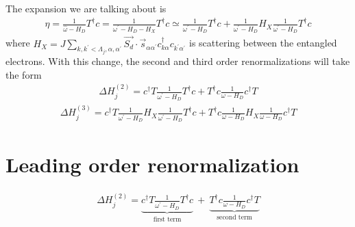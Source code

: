 \documentclass{revtex4-2}
\numberwithin{equation}{section}
\begin{document}
The expansion we are talking about is
\begin{equation}\begin{aligned}
	\eta = \frac{1}{\hat \omega - H_D}T^\dagger c = \frac{1}{\omega^\prime - H_D - H_X}T^\dagger c \simeq \frac{1}{\omega^\prime - H_D}T^\dagger c + \frac{1}{\omega^\prime - H_D}H_X \frac{1}{\omega^\prime - H_D} T^\dagger c
\end{aligned}\end{equation}
where \(H_X = J \sum_{k,k^\prime < \Lambda_j, \alpha,\alpha^\prime}\vec{S_d}\cdot\vec{s}_{\alpha \alpha^\prime}c^\dagger_{k\alpha}c_{k^\prime\alpha^\prime}\) is scattering between the entangled electrons.
With this change, the second and third order renormalizations will take the form
\begin{equation}\begin{aligned}
	\Delta H^{(2)}_j = c^\dagger T \frac{1}{\omega^\prime - H_D}T^\dagger c + T^\dagger c \frac{1}{\omega - H_D}c^\dagger T
\end{aligned}\end{equation}
\begin{equation}\begin{aligned}
	\Delta H^{(3)}_j = c^\dagger T \frac{1}{\omega^\prime - H_D} H_X \frac{1}{\omega^\prime - H_D} T^\dagger c + T^\dagger c \frac{1}{\omega - H_D} H_X \frac{1}{\omega - H_D} c^\dagger T
\end{aligned}\end{equation}

\section{Leading order renormalization}
\begin{equation}\begin{aligned}
	\Delta H^{(2)}_j = \underbrace{c^\dagger T \frac{1}{\omega^\prime - H_D}T^\dagger c}_\text{first term}~+~\underbrace{T^\dagger c \frac{1}{\omega - H_D}c^\dagger T}_\text{second term}
\end{aligned}\end{equation}
\end{document}
